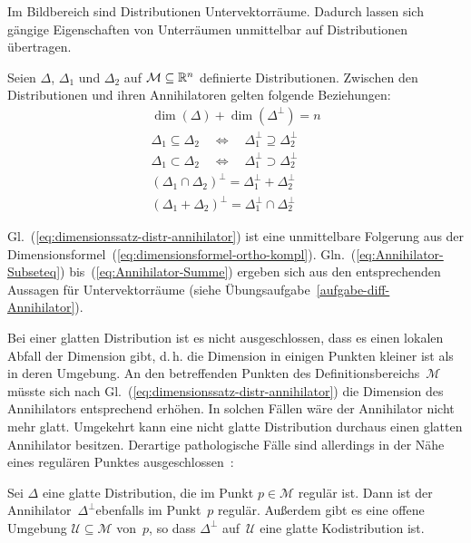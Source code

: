 Im Bildbereich sind Distributionen Untervektorräume. Dadurch lassen
sich gängige Eigenschaften von Unterräumen unmittelbar auf Distributionen
übertragen.
\begin{proposition}
\label{pro:Annihilator}Seien $\Delta$, $\Delta_{1}$ und $\Delta_{2}$
auf $\mathcal{M}\subseteq{\mathbb{R}}^{n}$ definierte Distributionen. Zwischen
den Distributionen und ihren Annihilatoren gelten folgende Beziehungen:
\begin{subequations}
\begin{gather}
\dim(\Delta)+\dim(\Delta^{\perp})=n\label{eq:dimensionssatz-distr-annihilator}\\
\Delta_{1}\subseteq\Delta_{2}\quad\Longleftrightarrow\quad\Delta_{1}^{\perp}\supseteq\Delta_{2}^{\perp}\label{eq:Annihilator-Subseteq}\\
\Delta_{1}\subset\Delta_{2}\quad\Longleftrightarrow\quad\Delta_{1}^{\perp}\supset\Delta_{2}^{\perp}\label{eq:eq:Annihilator-Subset}\\
\left(\Delta_{1}\cap\Delta_{2}\right)^{\perp}=\Delta_{1}^{\perp}+\Delta_{2}^{\perp}\label{eq:Annihilator-Schnitt}\\
\left(\Delta_{1}+\Delta_{2}\right)^{\perp}=\Delta_{1}^{\perp}\cap\Delta_{2}^{\perp}\label{eq:Annihilator-Summe}
\end{gather}
\end{subequations}
\end{proposition}
Gl.~(\ref{eq:dimensionssatz-distr-annihilator}) ist eine unmittelbare
Folgerung aus der Dimensions\-formel~(\ref{eq:dimensionsformel-ortho-kompl}).
Gln.~(\ref{eq:Annihilator-Subseteq}) bis~(\ref{eq:Annihilator-Summe})
ergeben sich aus den entsprechenden Aussagen für Unter\-vektor\-räume
(siehe Übungsaufgabe~\ref{aufgabe-diff-Annihilator}). \medskip{}

Bei einer glatten Distribution ist es nicht ausgeschlossen, dass es
einen lokalen Abfall der Dimension gibt, d.\,h. die Dimension in
einigen Punkten kleiner ist als in deren Umgebung. An den betreffenden
Punkten des Definitionsbereichs~$\mathcal{M}$ müsste sich nach Gl.~(\ref{eq:dimensionssatz-distr-annihilator})
die Dimension des Annihilators entsprechend erhöhen. In solchen Fällen
wäre der Annihilator nicht mehr glatt. Umgekehrt kann eine nicht glatte
Distribution durchaus einen glatten Annihilator besitzen. Derartige
pathologische Fälle sind allerdings in der Nähe eines regulären Punktes
ausgeschlossen~\cite[Lemma~{1.3.6}]{isidori3}:
\begin{lemma}
\label{lem:Annihilator-in-regulaerem-Punkt}Sei $\Delta$ eine glatte
Distribution, die im Punkt $p\in\mathcal{M}$ regulär ist. Dann ist
der Annihilator~$\Delta^{\perp}$ebenfalls im Punkt~$p$ regulär.
Außerdem gibt es eine offene Umgebung $\mathcal{U}\subseteq\mathcal{M}$
von~$p$, so dass $\Delta^{\perp}$ auf~$\mathcal{U}$ eine glatte
Kodistribution ist.
\end{lemma}

